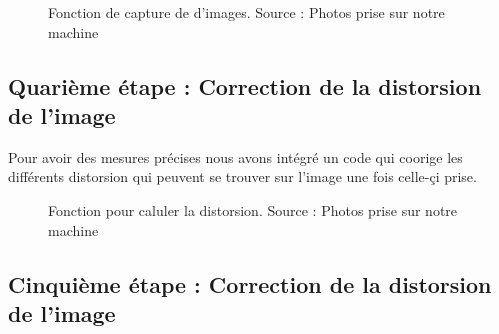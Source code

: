   \begin{figure}[H]%
 	\center%
 	\setlength{\fboxsep}{5pt}%
 	\setlength{\fboxrule}{0.5pt}%
 	\caption[Fonction de capture de d'images]{Fonction de capture de d'images. Source : Photos prise sur notre machine}
 	\label{fig:Fonction de capture de d'images}
 \end{figure}
 
 \subsection{Quarième étape : Correction de la distorsion de l'image}
 
 Pour avoir des mesures précises nous avons intégré un code qui coorige les différents distorsion qui peuvent se trouver sur l'image une fois celle-çi prise.
 
 \begin{figure}[H]%
 	\center%
 	\setlength{\fboxsep}{5pt}%
 	\setlength{\fboxrule}{0.5pt}%
 	\caption[Fonction pour caluler la distorsion]{Fonction pour caluler la distorsion. Source : Photos prise sur notre machine}
 	\label{fig:Fonction pour caluler la distorsion}
 \end{figure}
 
 \subsection{Cinquième étape : Correction de la distorsion de l'image}
 
